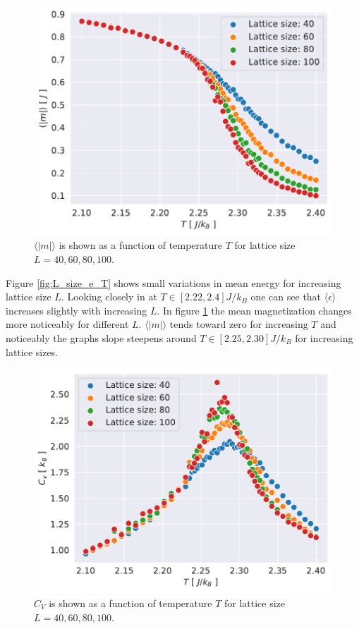 \documentclass[english,notitlepage,reprint,nofootinbib]{revtex4-1}  %
\begin{document}
\begin{figure}[H]
    \centering
    \includegraphics[width=.5\textwidth]{../figures/L_size_m_T.pdf}
    \caption{$\langle |m| \rangle$ is shown as a function of temperature $T$ for lattice size $L= 40, 60,80,100$.}
    \label{fig:L_size_m_T}
\end{figure}
Figure \ref{fig:L_size_e_T} shows small variations in mean energy for increasing lattice size $L$. Looking closely in at $T \in [2.22,2.4]J/k_B$ one can see that $\langle \epsilon \rangle$ increases slightly with increasing $L$. In figure \ref{fig:L_size_m_T} the mean magnetization changes more noticeably for different $L$. $\langle |m| \rangle$ tends toward zero for increasing $T$ and noticeably the graphs slope steepens around $T \in [2.25,2.30]J/k_B$ for increasing lattice sizes.

\begin{figure}[H]
    \centering
    \includegraphics[width=.5\textwidth]{../figures/L_size_c_v_T.pdf}
    \caption{$C_V$ is shown as a function of temperature $T$ for lattice size $L= 40, 60,80,100$.}
    \label{fig:L_size_c_v_T}
\end{figure}
\end{document}
